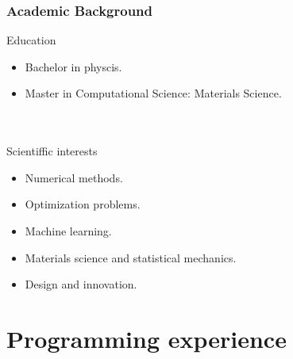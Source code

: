 \documentclass[
	10pt, %
]{beamer}
\begin{document}
\begin{frame}
	\frametitle{Academic Background}

	{\large Education}
	\begin{itemize}
		\item Bachelor in physcis.
		\item Master in Computational Science: Materials Science. 
	\end{itemize}
	\hfill \\
	\hfill \\
	{\large Scientiffic interests}
	\begin{itemize}
		\item Numerical methods.
		\item Optimization problems.
		\item Machine learning.
		\item Materials science and statistical mechanics.
		\item Design and innovation.
	\end{itemize}
\end{frame}


\section{Programming experience}
\end{document}
